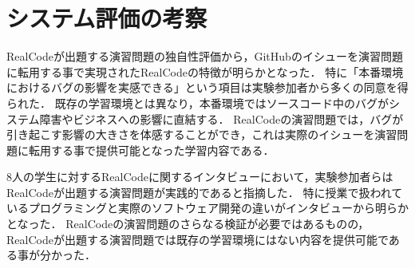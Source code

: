 

\section{システム評価の考察}

RealCodeが出題する演習問題の独自性評価から，GitHubのイシューを演習問題に転用する事で実現されたRealCodeの特徴が明らかとなった．
特に「本番環境におけるバグの影響を実感できる」という項目は実験参加者から多くの同意を得られた．
既存の学習環境とは異なり，本番環境ではソースコード中のバグがシステム障害やビジネスへの影響に直結する．
RealCodeの演習問題では，バグが引き起こす影響の大きさを体感することができ，これは実際のイシューを演習問題に転用する事で提供可能となった学習内容である．



8人の学生に対するRealCodeに関するインタビューにおいて，実験参加者らはRealCodeが出題する演習問題が実践的であると指摘した．
特に授業で扱われているプログラミングと実際のソフトウェア開発の違いがインタビューから明らかとなった．
RealCodeの演習問題のさらなる検証が必要ではあるものの，RealCodeが出題する演習問題では既存の学習環境にはない内容を提供可能である事が分かった．


